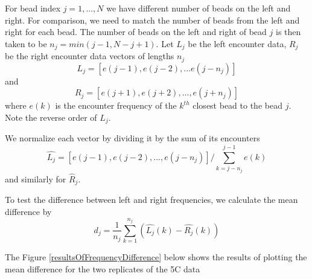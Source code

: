 \documentclass[12pt]{book}
\begin{document}
For bead index $j=1,...,N$ we have different number of beads on the left and right. For comparison, we need to match the number of beads from the left and right for each bead. The number of beads on the left and right of bead $j$ is then taken to be $n_j=min(j-1,N-j+1)$. 
Let $L_j$ be the left encounter data, $R_j$ be the right encounter data vectors of lengths $n_j$
\begin{equation*}
L_j=\left[e(j-1),e(j-2),...e(j-n_j)\right] 
\end{equation*}
and 
\begin{equation*}
R_j=\left[e(j+1), e(j+2),...,e(j+n_j)\right]
\end{equation*}
where $e(k)$ is the encounter frequency of the $k^{th}$ closest bead to the bead $j$. Note the reverse order of $L_j$.

We normalize each vector by dividing it by the sum of its encounters
\begin{equation*}
\hat{L_j} =\left[e(j-1),e(j-2),...,e(j-n_j)\right]/\sum_{k=j-n_j}^{j-1}e(k)
\end{equation*}
and similarly for $\hat{R}_j$.

To test the difference between left and right frequencies, we calculate the mean difference by 
\begin{equation*}
d_j=\frac{1}{n_j}\sum_{k=1}^{n_j} \left(\hat{L_j}(k)-\hat{R_j}(k)\right)
\end{equation*}

The Figure \ref{resultsOfFrequencyDifference} below shows the results of plotting the mean difference for the two replicates of the 5C data 
\end{document}
